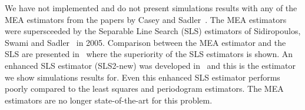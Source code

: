 \documentclass[a4paper,10pt]{article}
\begin{document}
\begin{enumerate}
We have not implemented and do not present simulations results with any of the MEA estimators from the papers by Casey and Sadler~\cite{536682,726812}.  The MEA estimators were supersceeded by the Separable Line Search (SLS) estimators of Sidiropoulos, Swami and Sadler~\cite{Sidiropoulos2005} in 2005.  Comparison between the MEA estimator and the SLS are presented in~\cite{Sidiropoulos2005} where the superiority of the SLS estimators is shown.  An enhanced SLS estimator (SLS2-new) was developed in~\cite{Clarkson2007} and this is the estimator we show simulations results for.  Even this enhanced SLS estimator performs poorly compared to the least squares and periodogram estimators.  The MEA estimators are no longer state-of-the-art for this problem.





\end{enumerate}
\end{document}
